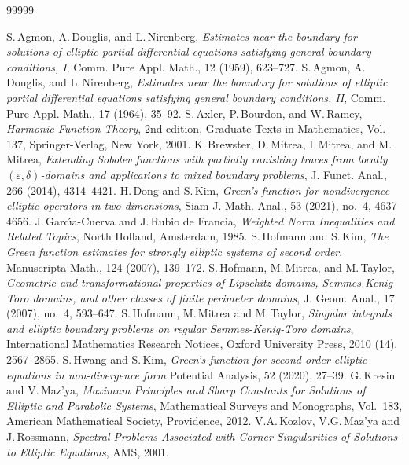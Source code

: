 \documentclass[11pt,reqno]{amsart}
\numberwithin{equation}{section}
\theoremstyle{remark}
\begin{document}
\begin{thebibliography}{99999}
\parskip=0.1cm


 S.\,Agmon, A.\,Douglis, and L.\,Nirenberg, {\it Estimates near the
boundary for solutions of elliptic partial differential equations satisfying general
boundary conditions, I}, Comm. Pure Appl. Math., 12 (1959), 623--727.
%
 S.\,Agmon, A.\,Douglis, and L.\,Nirenberg, {\it Estimates near the
boundary for solutions of elliptic partial differential equations satisfying general
boundary conditions, II}, Comm. Pure Appl. Math., 17 (1964), 35--92.
%
 S.\,Axler, P.\,Bourdon, and W.\,Ramey, {\it Harmonic Function Theory}, 2nd edition,
Graduate Texts in Mathematics, Vol.\,137, Springer-Verlag, New York, 2001.
%
 K.\,Brewster, D.\,Mitrea, I.\,Mitrea, and M.\,Mitrea, 
{\it Extending Sobolev functions with partially vanishing traces from locally 
$(\varepsilon,\delta)$-domains and applications to mixed boundary problems}, J. Funct. Anal., 266 (2014), 4314--4421.
%
 H.\,Dong and S.\,Kim, {\it Green's function for nondivergence elliptic operators in two dimensions}, 
Siam J. Math. Anal., 53 (2021), no.~4, 4637--4656.
%
 J.\,Garc{\'\i}a-Cuerva and J.\,Rubio de Francia, {\it Weighted Norm
Inequalities and Related Topics}, North Holland, Amsterdam, 1985.
%
 S.\,Hofmann and S.\,Kim, {\it The Green function estimates for strongly elliptic systems of second order},
Manuscripta Math., 124 (2007), 139--172.
%
 S.\,Hofmann, M.\,Mitrea, and M.\,Taylor, {\it Geometric and transformational 
properties of Lipschitz domains, Semmes-Kenig-Toro domains, and other classes of finite perimeter 
domains}, J. Geom. Anal., 17 (2007), no.~4, 593--647.
%
 S.\,Hofmann, M.\,Mitrea and M.\,Taylor, {\it Singular integrals and elliptic 
boundary problems on regular Semmes-Kenig-Toro domains}, International Mathematics Research Notices, 
Oxford University Press, 2010 (14), 2567--2865.
%
 S.\,Hwang and S.\,Kim, {\it Green's function for second order elliptic equations in non-divergence form}
Potential Analysis, 52 (2020), 27--39.
%
 G.\,Kresin and V.\,Maz'ya, {\it Maximum Principles and Sharp Constants for Solutions
of Elliptic and Parabolic Systems}, Mathematical Surveys and Monographs, Vol.~183, American Mathematical 
Society, Providence, 2012.
%
 V.A.\,Kozlov, V.G.\,Maz'ya and J.\,Rossmann, {\it Spectral Problems 
Associated with Corner Singularities of Solutions to Elliptic Equations}, AMS, 2001.

\end{thebibliography}
\end{document}
